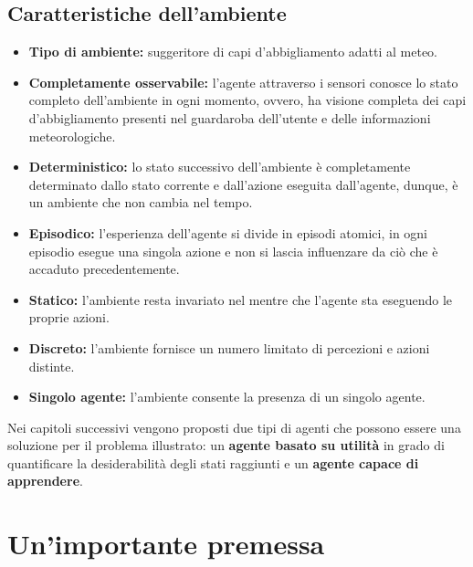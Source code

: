 \documentclass[a4paper, 11pt, oneside]{report}
\begin{document}
            \subsection{Caratteristiche dell'ambiente}
                \begin{itemize}
                    \item \textbf{Tipo di ambiente:} suggeritore di capi d'abbigliamento adatti al meteo.
                    \item \textbf{Completamente osservabile:} l'agente attraverso i sensori conosce lo stato
                    completo dell'ambiente in ogni momento, ovvero, ha visione completa dei capi d'abbigliamento presenti
                    nel guardaroba dell'utente e delle informazioni meteorologiche.
                    \item \textbf{Deterministico:} lo stato successivo dell'ambiente è completamente determinato dallo
                    stato corrente e dall'azione eseguita dall'agente, dunque, è un ambiente che non cambia nel tempo.
                    \item \textbf{Episodico:} l'esperienza dell'agente si divide in episodi atomici, in ogni episodio
                    esegue una singola azione e non si lascia influenzare da ciò che è accaduto precedentemente.
                    \item \textbf{Statico:} l'ambiente resta invariato nel mentre che l'agente sta eseguendo le proprie azioni.
                    \item \textbf{Discreto:} l'ambiente fornisce un numero limitato di percezioni e azioni distinte.
                    \item \textbf{Singolo agente:} l'ambiente consente la presenza di un singolo agente.
                \end{itemize}
                \bigskip
                \par \noindent Nei capitoli successivi vengono proposti due tipi di agenti che possono essere una soluzione per il problema illustrato:
                 un \textbf{agente basato su utilità} in grado di quantificare la desiderabilità
                degli stati raggiunti e un \textbf{agente capace di apprendere}.
    \section{Un'importante premessa}
    \label{sec:premessa}
\end{document}
